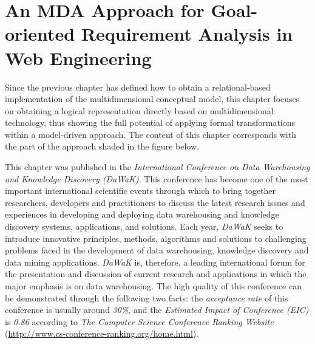 %
%
%



\chapter{An MDA Approach for Goal-oriented Requirement Analysis in Web Engineering}
\label{c4} %

Since the previous chapter has defined how to obtain a
relational-based implementation of the multidimensional conceptual
model, this chapter focuses on obtaining a logical representation
directly based on multidimensional technology, thus showing the full
potential of applying formal transformations within a model-driven
approach. The content of this chapter corresponds with the part of
the approach shaded in the figure below.



This chapter was published in the \emph{International Conference on
Data Warehousing and Knowledge Discovery (DaWaK)}. This conference
has become one of the most important international scientific events
through which to bring together researchers, developers and
practitioners to discuss the latest research issues and experiences
in developing and deploying data warehousing and knowledge discovery
systems, applications, and solutions. Each year, \emph{DaWaK} seeks
to introduce innovative principles, methods, algorithms and
solutions to challenging problems faced in the development of data
warehousing, knowledge discovery and data mining applications.
\emph{DaWaK} is, therefore, a leading international forum for the
presentation and discussion of current research and applications in
which the major emphasis is on data warehousing. The high quality of
this conference can be demonstrated through the following two facts:
the \emph{acceptance rate} of this conference is usually around
\emph{30\%}, and the \emph{Estimated Impact of Conference (EIC)} is
\emph{0.86} according to \emph{The Computer Science Conference
Ranking Website}
(\url{http://www.cs-conference-ranking.org/home.html}).



%

